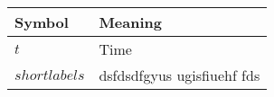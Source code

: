 \documentclass{article}
\begin{document}
	
\begin{table}[h]
\centering
\vspace{3pt}
\begin{tabular}{>{ \centering \arraybackslash}p{5em}>{ \centering \arraybackslash}p{30em}}
\toprule %
   Symbol & Meaning    \\
\midrule
 $t$ & Time  \\ 
 $ shortlabels
  $ & dsfdsdfgyus ugisfiuehf fds  \\
  


\bottomrule
\end{tabular}
\end{table}
	
\end{document}
